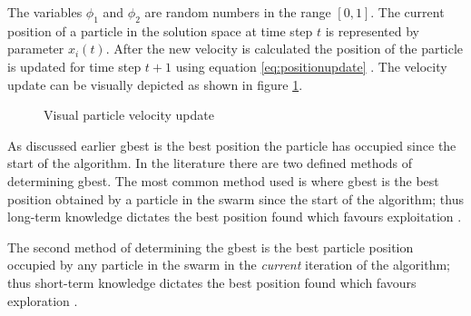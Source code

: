 The variables $\phi_1$ and $\phi_2$ are random numbers in the range $[0,1]$. The current position of a particle in the solution space at time step $t$ is represented by parameter $x_i(t)$\cite{FundamentalSwarm,CompuIntelligenceIntro}. After the new velocity is calculated the position of the particle is updated for time step $t+1$ using equation \ref{eq:positionupdate} \cite{FundamentalSwarm,CompuIntelligenceIntro}. The velocity update can be visually depicted as shown in figure \ref{fig:particleVelocityUpdate}. 
\begin{figure}[h]
	\begin{center}
	\caption{Visual particle velocity update \cite{SOSwarm,FundamentalSwarm,CompuIntelligenceIntro,PSOSelfHierarch}}

	\label{fig:particleVelocityUpdate}
	\end{center}
\end{figure}

As discussed earlier gbest is the best position the particle has occupied since the start of the algorithm. In the literature there are two defined methods of determining gbest. The most common method used is where gbest is the best position obtained by a particle in the swarm since the start of the algorithm; thus long-term knowledge dictates the best position found which favours exploitation \cite{CompuIntelligenceIntro,FundamentalSwarm}.

The second method of determining the gbest is the best particle position occupied by any particle in the swarm in the \emph{current} iteration of the algorithm; thus short-term knowledge dictates the best position found which favours exploration \cite{CompuIntelligenceIntro,FundamentalSwarm}.

